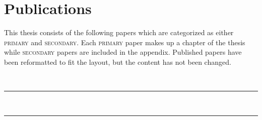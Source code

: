 
\chapter[publications]{Publications}

This thesis consists of the following papers which are categorized as either \textsc{primary} and \textsc{secondary}. 
Each \textsc{primary} paper makes up a chapter of the thesis while \textsc{secondary} papers are included in the appendix. 
Published papers have been reformatted to fit the layout, but the content has not been changed. 

\vspace{5mm}

\raggedright\par\noindent\hspace{8mm}{\large\scshape primary}\\[-2mm]

\raggedleft\rule{\textwidth - 8mm}{0.4pt}

\begin{enumerate}[leftmargin=8mm,topsep=0mm,label={[\Alph*]}]

    \item {}
    \item {} 
    \item {}

\end{enumerate}

\vspace{5mm}

\raggedright\par\noindent\hspace{8mm}{\large\scshape secondary}\\[-2mm]

\raggedleft\rule{\textwidth - 8mm}{0.4pt}

\begin{enumerate}[leftmargin=8mm,topsep=0mm,label={[\Alph*]}]
    \setcounter{enumi}{2}

    \item {}
    \item {}
    \item {}
    \item {}
    \item {}

\end{enumerate}


\justifying

\vspace*{\fill}

